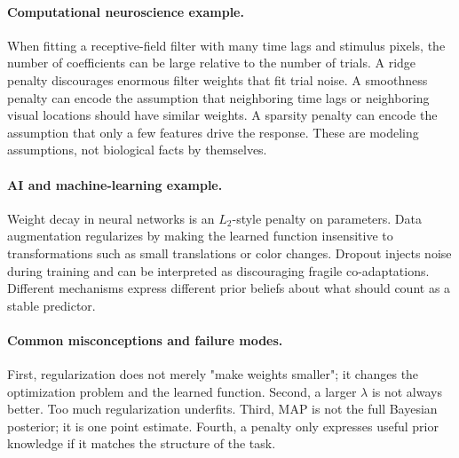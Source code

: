 \paragraph{Computational neuroscience example.}
When fitting a receptive-field filter with many time lags and stimulus pixels, the number of coefficients can be large relative to the number of trials. A ridge penalty discourages enormous filter weights that fit trial noise. A smoothness penalty can encode the assumption that neighboring time lags or neighboring visual locations should have similar weights. A sparsity penalty can encode the assumption that only a few features drive the response. These are modeling assumptions, not biological facts by themselves.

\paragraph{AI and machine-learning example.}
Weight decay in neural networks is an \(L_2\)-style penalty on parameters. Data augmentation regularizes by making the learned function insensitive to transformations such as small translations or color changes. Dropout injects noise during training and can be interpreted as discouraging fragile co-adaptations. Different mechanisms express different prior beliefs about what should count as a stable predictor.

\paragraph{Common misconceptions and failure modes.}
First, regularization does not merely "make weights smaller"; it changes the optimization problem and the learned function. Second, a larger \(\lambda\) is not always better. Too much regularization underfits. Third, MAP is not the full Bayesian posterior; it is one point estimate. Fourth, a penalty only expresses useful prior knowledge if it matches the structure of the task.

